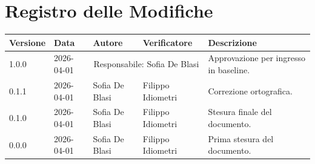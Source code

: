 \section*{Registro delle Modifiche}
\begin{table}[ht]
	\centering
	\renewcommand{\arraystretch}{1.5}
	\begin{tabularx}{\textwidth}{l l l l X}
		\toprule
		\textbf{Versione} & \textbf{Data} & \textbf{Autore} & \textbf{Verificatore} & \textbf{Descrizione} \\
		\midrule		
		1.0.0 & 2026-04-01 & \multicolumn{2}{c}{Responsabile: Sofia De Blasi}& Approvazione per ingresso in baseline. \\
		0.1.1 & 2026-04-01 & Sofia De Blasi & Filippo Idiometri & Correzione ortografica. \\
		0.1.0 & 2026-04-01 & Sofia De Blasi & Filippo Idiometri & Stesura finale del documento. \\
		0.0.0 & 2026-04-01 & Sofia De Blasi & Filippo Idiometri & Prima stesura del documento. \\
		\bottomrule
	\end{tabularx}
\end{table}